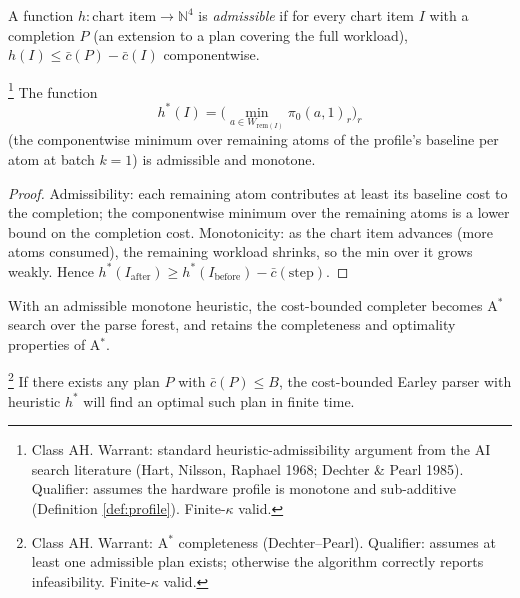 \begin{definition}\label{def:heuristic}
  A function $h : \text{chart item} \to
  \mathbb{N}^4$ is \emph{admissible} if for every
  chart item $I$ with a completion $P$ (an extension
  to a plan covering the full workload), $h(I) \leq
  \bar{c}(P) - \bar{c}(I)$ componentwise.
\end{definition}

\begin{proposition}
  \label{prop:heuristic-monotone}
  \footnote{Class \textsf{AH}. Warrant: standard
  heuristic-admissibility argument from the AI search
  literature (Hart, Nilsson, Raphael 1968; Dechter \&
  Pearl 1985). Qualifier: assumes the hardware
  profile is monotone and sub-additive
  (Definition \ref{def:profile}). Finite-$\kappa$
  valid.}
  The function
  \begin{equation}
    h^*(I) = \big(
      \min_{a \in W_{\mathrm{rem}(I)}} \pi_0(a, 1)_r
    \big)_r
  \end{equation}
  (the componentwise minimum over remaining atoms of
  the profile's baseline per atom at batch $k=1$) is
  admissible and monotone.
\end{proposition}

\begin{proof}
  Admissibility: each remaining atom contributes at
  least its baseline cost to the completion; the
  componentwise minimum over the remaining atoms is
  a lower bound on the completion cost.
  Monotonicity: as the chart item advances (more
  atoms consumed), the remaining workload shrinks,
  so the min over it grows weakly. Hence
  $h^*(I_\text{after}) \geq h^*(I_\text{before}) -
  \bar{c}(\text{step})$.
\end{proof}

With an admissible monotone heuristic, the
cost-bounded completer becomes A$^*$ search over
the parse forest, and retains the completeness and
optimality properties of A$^*$.

\begin{theorem}
  \label{thm:earley-complete}
  \footnote{Class \textsf{AH}. Warrant: A$^*$
  completeness (Dechter--Pearl). Qualifier: assumes
  at least one admissible plan exists; otherwise the
  algorithm correctly reports infeasibility.
  Finite-$\kappa$ valid.}
  If there exists any plan $P$ with $\bar{c}(P)
  \leq B$, the cost-bounded Earley parser with
  heuristic $h^*$ will find an optimal such plan
  in finite time.
\end{theorem}

